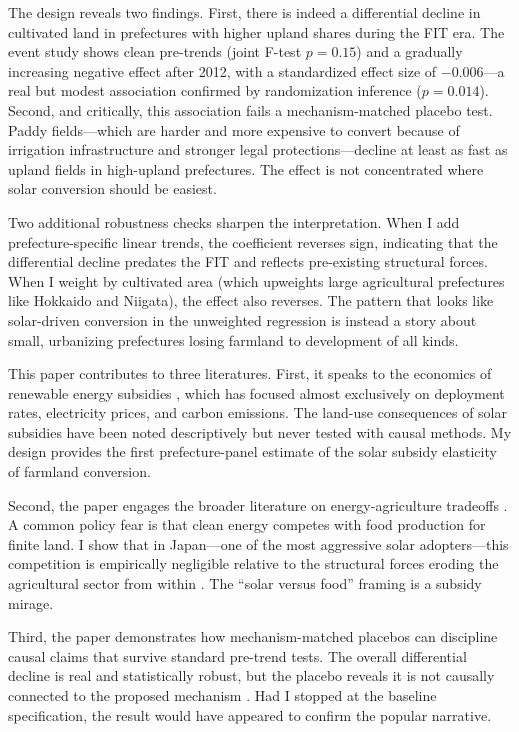 \documentclass[12pt]{article}
\begin{document}
The design reveals two findings. First, there is indeed a differential decline in cultivated land in prefectures with higher upland shares during the FIT era. The event study shows clean pre-trends (joint F-test $p = 0.15$) and a gradually increasing negative effect after 2012, with a standardized effect size of $-0.006$---a real but modest association confirmed by randomization inference ($p = 0.014$). Second, and critically, this association fails a mechanism-matched placebo test. Paddy fields---which are harder and more expensive to convert because of irrigation infrastructure and stronger legal protections---decline at least as fast as upland fields in high-upland prefectures. The effect is not concentrated where solar conversion should be easiest.

Two additional robustness checks sharpen the interpretation. When I add prefecture-specific linear trends, the coefficient reverses sign, indicating that the differential decline predates the FIT and reflects pre-existing structural forces. When I weight by cultivated area (which upweights large agricultural prefectures like Hokkaido and Niigata), the effect also reverses. The pattern that looks like solar-driven conversion in the unweighted regression is instead a story about small, urbanizing prefectures losing farmland to development of all kinds.

This paper contributes to three literatures. First, it speaks to the economics of renewable energy subsidies \citep{Borenstein2017, Covert2016, Hughes2018, Fell2021}, which has focused almost exclusively on deployment rates, electricity prices, and carbon emissions. The land-use consequences of solar subsidies have been noted descriptively \citep{Sunak2016, Taghizadeh2019} but never tested with causal methods. My design provides the first prefecture-panel estimate of the solar subsidy elasticity of farmland conversion.

Second, the paper engages the broader literature on energy-agriculture tradeoffs \citep{Kalkuhl2013, Letchumanan2022}. A common policy fear is that clean energy competes with food production for finite land. I show that in Japan---one of the most aggressive solar adopters---this competition is empirically negligible relative to the structural forces eroding the agricultural sector from within \citep{Asai2022, Oda2019}. The ``solar versus food'' framing is a subsidy mirage.

Third, the paper demonstrates how mechanism-matched placebos can discipline causal claims that survive standard pre-trend tests. The overall differential decline is real and statistically robust, but the placebo reveals it is not causally connected to the proposed mechanism \citep{Roth2023, Imbens2009}. Had I stopped at the baseline specification, the result would have appeared to confirm the popular narrative.
\end{document}
